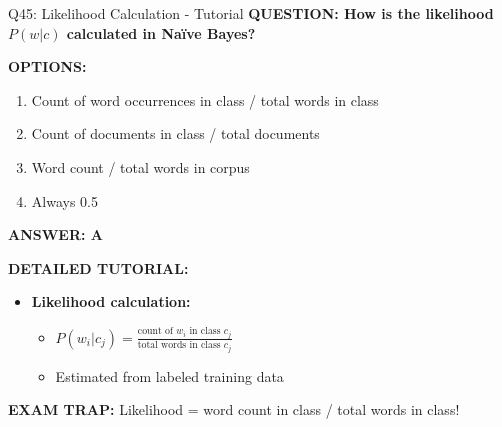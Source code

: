 \documentclass[8pt]{beamer}
\begin{document}
	\begin{frame}{Q45: Likelihood Calculation - Tutorial}
		\fontsize{6.5}{7.5}\selectfont
		\textbf{QUESTION: How is the likelihood $P(w|c)$ calculated in Naïve Bayes?}
		
		\vspace{0.1cm}
		\textbf{OPTIONS:}
		\begin{enumerate}
			\item Count of word occurrences in class / total words in class
			\item Count of documents in class / total documents
			\item Word count / total words in corpus
			\item Always 0.5
		\end{enumerate}
		
		\vspace{0.1cm}
		\textcolor{myblue}{\textbf{ANSWER: A}}
		
		\vspace{0.1cm}
		\textbf{DETAILED TUTORIAL:}
		\begin{itemize}
			\item \textbf{Likelihood calculation:}
			\begin{itemize}
				\item $P(w_i | c_j) = \frac{\text{count of } w_i \text{ in class } c_j}{\text{total words in class } c_j}$
				\item Estimated from labeled training data
			\end{itemize}
		\end{itemize}
		
		\textcolor{myred}{\textbf{EXAM TRAP:}} Likelihood = \textcolor{myblue}{word count in class / total words in class}!
	\end{frame}
	
\end{document}
